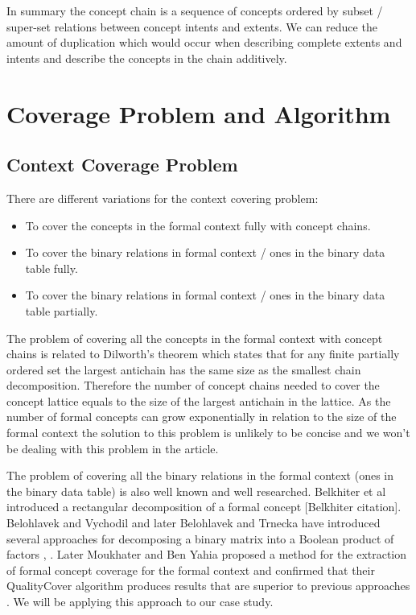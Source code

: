 \documentclass[acmconf,authordraft]{acmart}
\begin{document}
In summary the concept chain is a sequence of concepts ordered by subset / super-set relations between concept intents and extents. We can reduce the amount of duplication which would occur when describing complete extents and intents and describe the concepts in the chain additively.

\section{Coverage Problem and Algorithm}
\subsection{Context Coverage Problem}

There are different variations for the context covering problem:

\begin{itemize}
  \item To cover the concepts in the formal context fully with concept chains.
  \item To cover the binary relations in formal context / ones in the binary data table fully.
  \item To cover the binary relations in formal context / ones in the binary data table partially.
\end{itemize}

The problem of covering all the concepts in the formal context with concept chains is related to Dilworth's theorem \cite{dilworth_decomposition_1950} which states that for any finite partially ordered set the largest antichain has the same size as the smallest chain decomposition. Therefore the number of concept chains needed to cover the concept lattice equals to the size of the largest antichain in the lattice. As the number of formal concepts can grow exponentially in relation to the size of the formal context the solution to this problem is unlikely to be concise and we won't be dealing with this problem in the article.

The problem of covering all the binary relations in the formal context (ones in the binary data table) is also well known and well researched.  Belkhiter et al introduced a rectangular decomposition of a formal concept [Belkhiter citation]. Belohlavek and Vychodil and later Belohlavek and Trnecka have introduced several approaches for decomposing a binary matrix into a Boolean product of factors \cite{belohlavek_discovery_2010}, \cite{belohlavek_-below_2015}. Later Moukhater and Ben Yahia proposed a method for the extraction of formal concept coverage for the formal context and confirmed that their QualityCover algorithm produces results that are superior to previous approaches \cite{mouakher_qualitycover:_2016}. We will be applying this approach to our case study.
\end{document}
